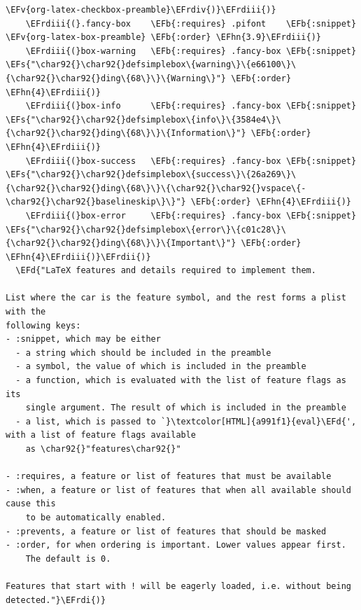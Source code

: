 \documentclass{scrartcl}
\newcommand{\EFd}[1]{\textcolor{EFd}{#1}} %
\newcommand{\EFs}[1]{\textcolor{EFs}{#1}} %
\newcommand{\EFb}[1]{\textcolor{EFb}{#1}} %
\newcommand{\EFv}[1]{\textcolor{EFv}{#1}} %
\newcommand{\EFhn}[1]{#1} %
\newcommand{\EFrdi}[1]{#1} %
\newcommand{\EFrdii}[1]{#1} %
\newcommand{\EFrdiii}[1]{#1} %
\newcommand{\EFrdiv}[1]{#1} %
\begin{document}
\begin{Code}
\begin{Verbatim}[]
                                    \EFv{org-latex-checkbox-preamble}\EFrdiv{)}\EFrdiii{)}
    \EFrdiii{(}.fancy-box    \EFb{:requires} .pifont    \EFb{:snippet} \EFv{org-latex-box-preamble} \EFb{:order} \EFhn{3.9}\EFrdiii{)}
    \EFrdiii{(}box-warning   \EFb{:requires} .fancy-box \EFb{:snippet} \EFs{"\char92{}\char92{}defsimplebox\{warning\}\{e66100\}\{\char92{}\char92{}ding\{68\}\}\{Warning\}"} \EFb{:order} \EFhn{4}\EFrdiii{)}
    \EFrdiii{(}box-info      \EFb{:requires} .fancy-box \EFb{:snippet} \EFs{"\char92{}\char92{}defsimplebox\{info\}\{3584e4\}\{\char92{}\char92{}ding\{68\}\}\{Information\}"} \EFb{:order} \EFhn{4}\EFrdiii{)}
    \EFrdiii{(}box-success   \EFb{:requires} .fancy-box \EFb{:snippet} \EFs{"\char92{}\char92{}defsimplebox\{success\}\{26a269\}\{\char92{}\char92{}ding\{68\}\}\{\char92{}\char92{}vspace\{-\char92{}\char92{}baselineskip\}\}"} \EFb{:order} \EFhn{4}\EFrdiii{)}
    \EFrdiii{(}box-error     \EFb{:requires} .fancy-box \EFb{:snippet} \EFs{"\char92{}\char92{}defsimplebox\{error\}\{c01c28\}\{\char92{}\char92{}ding\{68\}\}\{Important\}"} \EFb{:order} \EFhn{4}\EFrdiii{)}\EFrdii{)}
  \EFd{"LaTeX features and details required to implement them.

List where the car is the feature symbol, and the rest forms a plist with the
following keys:
- :snippet, which may be either
  - a string which should be included in the preamble
  - a symbol, the value of which is included in the preamble
  - a function, which is evaluated with the list of feature flags as its
    single argument. The result of which is included in the preamble
  - a list, which is passed to `}\textcolor[HTML]{a991f1}{eval}\EFd{', with a list of feature flags available
    as \char92{}"features\char92{}"

- :requires, a feature or list of features that must be available
- :when, a feature or list of features that when all available should cause this
    to be automatically enabled.
- :prevents, a feature or list of features that should be masked
- :order, for when ordering is important. Lower values appear first.
    The default is 0.

Features that start with ! will be eagerly loaded, i.e. without being detected."}\EFrdi{)}
\end{Verbatim}
\end{Code}
\end{document}
